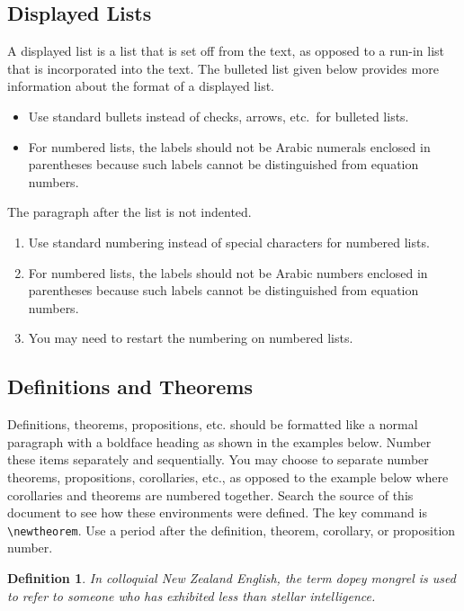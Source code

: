 \documentclass{scspaperproc}
\theoremstyle{scsthe}
\newtheorem{definition}{Definition}
\begin{document}
    \subsection{Displayed Lists}
    A displayed list is a list that is set off from the text, as opposed to a run-in list that is incorporated into the text. The bulleted list given below provides more information about the format of a displayed list.
    \begin{itemize}
        \item Use standard bullets instead of checks, arrows, etc.\ for bulleted lists.
        \item For numbered lists, the labels should not be Arabic numerals enclosed in parentheses because such labels cannot be distinguished from equation numbers.
    \end{itemize}

    The paragraph after the list is not indented.
    \begin{enumerate}
        \item Use standard numbering instead of special characters for numbered lists.
        \item For numbered lists, the labels should not be Arabic numbers enclosed in parentheses because such labels cannot be distinguished from equation numbers.
        \item You may need to restart the numbering on numbered lists.
    \end{enumerate}


    \subsection{Definitions and Theorems}
    Definitions, theorems, propositions, etc. should be formatted like a normal paragraph with a boldface heading as shown in the examples below. Number these items separately and sequentially. You may choose to separate number theorems, propositions, corollaries, etc., as opposed to the example below where corollaries and theorems are numbered together. Search the source of this document to see how these environments were defined. The key command is \verb+\newtheorem+. Use a period after the definition, theorem, corollary, or proposition number.

    \begin{definition}
        In colloquial New Zealand English, the term \emph{dopey mongrel} is used to refer to someone who has exhibited less than stellar intelligence.
    \end{definition}
\end{document}
